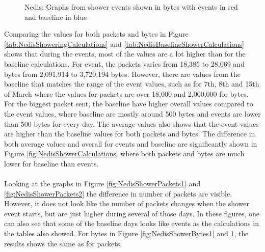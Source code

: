 \begin{figure}[H]
\begin{subfigure}[b]{0.47\textwidth}
    \end{subfigure}
        \begin{subfigure}[b]{0.47\textwidth}
        \centering
    \end{subfigure}
    \begin{subfigure}[b]{0.47\textwidth}
        \centering
    \end{subfigure}
    \begin{subfigure}[b]{0.47\textwidth}
        \centering
    \end{subfigure}
    \hspace{0.6cm}
    \begin{subfigure}[b]{0.47\textwidth}
    \centering
        \end{subfigure}
    \caption{Nedis: Graphs from shower events shown in bytes with events in red and baseline in blue}
    \label{fig:NedisShowerBytes2}
\end{figure}

Comparing the values for both packets and bytes in Figure \ref{tab:NedisShoweringCalculations} and \ref{tab:NedisBaselineShowerCalculations} shows that during the events, most of the values are a lot higher than for the baseline calculations. For event, the packets varies from 18,385 to 28,069 and bytes from 2,091,914 to 3,720,194 bytes. However, there are values from the baseline that matches the range of the event values, such as for 7th, 8th and 15th of March where the values for packets are over 18,000 and 2,000,000 for bytes. For the biggest packet sent, the baseline have higher overall values compared to the event values, where baseline are mostly around 500 bytes and events are lower than 500 bytes for every day. The average values also shows that the event values are higher than the baseline values for both packets and bytes. The difference in both average values and overall for events and baseline are significantly shown in Figure \ref{fig:NedisShowerCalculations} where both packets and bytes are much lower for baseline than events. 
\\\\
Looking at the graphs in Figure \ref{fig:NedisShowerPackets1} and \ref{fig:NedisShowerPackets2} the difference in number of packets are visible. However, it does not look like the number of packets changes when the shower event starts, but are just higher during several of those days. In these figures, one can also see that some of the baseline days looks like events as the calculations in the tables also showed. For bytes in Figure \ref{fig:NedisShowerBytes1} and \ref{fig:NedisShowerBytes2}, the results shows the same as for packets. 

